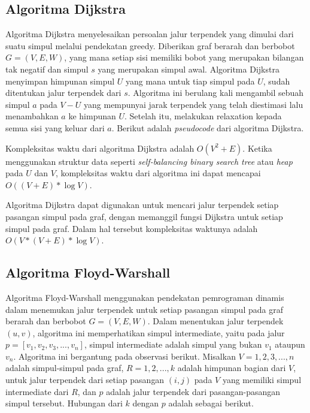     \subsection{Algoritma Dijkstra}
        Algoritma Dijkstra menyelesaikan persoalan jalur terpendek yang dimulai dari suatu simpul melalui pendekatan greedy. Diberikan graf berarah dan berbobot $G = (V, E, W)$, 
        yang mana setiap sisi memiliki bobot yang merupakan bilangan tak negatif dan simpul $s$ yang merupakan simpul awal. Algoritma Dijkstra menyimpan himpunan simpul $U$ yang 
        mana untuk tiap simpul pada $U$, sudah ditentukan jalur terpendek dari $s$. Algoritma ini berulang kali mengambil sebuah simpul $a$ pada $V - U$ yang mempunyai jarak terpendek 
        yang telah diestimasi lalu menambahkan $a$ ke himpunan $U$. Setelah itu, melakukan relaxation kepada semua sisi yang keluar dari $a$. 
        Berikut adalah \textit{pseudocode} dari algoritma Dijkstra.

        \medskip
        

        Kompleksitas waktu dari algoritma Dijkstra adalah $O(V^{2} + E)$. Ketika menggunakan struktur data seperti \textit{self-balancing binary search tree} 
        atau \textit{heap} pada $U$ dan $V$, kompleksitas waktu dari algoritma ini dapat mencapai $O((V + E) * \log V)$.

        Algoritma Dijkstra dapat digunakan untuk mencari jalur terpendek setiap pasangan simpul pada graf, dengan memanggil fungsi Dijkstra untuk setiap simpul pada graf. 
        Dalam hal tersebut kompleksitas waktunya adalah $O(V*(V + E)* \log V)$.

    \subsection{Algoritma Floyd-Warshall}
        Algoritma Floyd-Warshall menggunakan pendekatan pemrograman dinamis dalam menemukan jalur terpendek untuk setiap pasangan simpul pada graf berarah dan 
        berbobot $G = (V, E, W)$. Dalam menentukan jalur terpendek $(u,v)$, algoritma ini memperhatikan simpul intermediate, yaitu pada jalur 
        $p = [v_{1}, v_{2}, v_{3}, ..., v_{n}]$, simpul intermediate adalah simpul yang bukan $v_{1}$ ataupun $v_{n}$. Algoritma ini bergantung pada observasi berikut. 
        Misalkan $V = {1, 2, 3, ..., n}$ adalah simpul-simpul pada graf, $R = {1, 2, ..., k}$ adalah himpunan bagian dari $V$, untuk jalur terpendek dari 
        setiap pasangan $(i, j)$ pada $V$ yang memiliki simpul intermediate dari $R$, dan $p$ adalah jalur terpendek dari pasangan-pasangan simpul tersebut. 
        Hubungan dari $k$ dengan $p$ adalah sebagai berikut.

